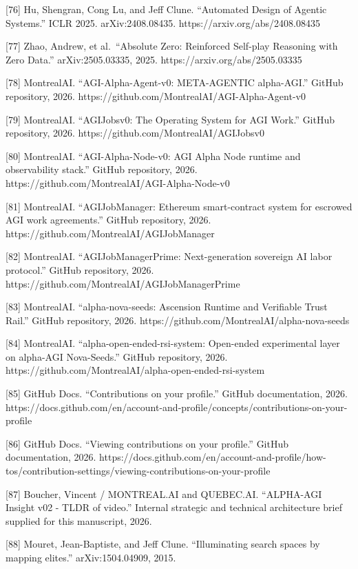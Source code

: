 \documentclass[
  11pt,
]{article}
\begin{document}
{[}76{]} Hu, Shengran, Cong Lu, and Jeff Clune. ``Automated Design of
Agentic Systems.'' ICLR 2025. arXiv:2408.08435.
https://arxiv.org/abs/2408.08435

{[}77{]} Zhao, Andrew, et al.~``Absolute Zero: Reinforced Self-play
Reasoning with Zero Data.'' arXiv:2505.03335, 2025.
https://arxiv.org/abs/2505.03335

{[}78{]} MontrealAI. ``AGI-Alpha-Agent-v0: META-AGENTIC alpha-AGI.''
GitHub repository, 2026.
https://github.com/MontrealAI/AGI-Alpha-Agent-v0

{[}79{]} MontrealAI. ``AGIJobsv0: The Operating System for AGI Work.''
GitHub repository, 2026. https://github.com/MontrealAI/AGIJobsv0

{[}80{]} MontrealAI. ``AGI-Alpha-Node-v0: AGI Alpha Node runtime and
observability stack.'' GitHub repository, 2026.
https://github.com/MontrealAI/AGI-Alpha-Node-v0

{[}81{]} MontrealAI. ``AGIJobManager: Ethereum smart-contract system for
escrowed AGI work agreements.'' GitHub repository, 2026.
https://github.com/MontrealAI/AGIJobManager

{[}82{]} MontrealAI. ``AGIJobManagerPrime: Next-generation sovereign AI
labor protocol.'' GitHub repository, 2026.
https://github.com/MontrealAI/AGIJobManagerPrime

{[}83{]} MontrealAI. ``alpha-nova-seeds: Ascension Runtime and
Verifiable Trust Rail.'' GitHub repository, 2026.
https://github.com/MontrealAI/alpha-nova-seeds

{[}84{]} MontrealAI. ``alpha-open-ended-rsi-system: Open-ended
experimental layer on alpha-AGI Nova-Seeds.'' GitHub repository, 2026.
https://github.com/MontrealAI/alpha-open-ended-rsi-system

{[}85{]} GitHub Docs. ``Contributions on your profile.'' GitHub
documentation, 2026.
https://docs.github.com/en/account-and-profile/concepts/contributions-on-your-profile

{[}86{]} GitHub Docs. ``Viewing contributions on your profile.'' GitHub
documentation, 2026.
https://docs.github.com/en/account-and-profile/how-tos/contribution-settings/viewing-contributions-on-your-profile

{[}87{]} Boucher, Vincent / MONTREAL.AI and QUEBEC.AI. ``ALPHA-AGI
Insight v02 - TLDR of video.'' Internal strategic and technical
architecture brief supplied for this manuscript, 2026.

{[}88{]} Mouret, Jean-Baptiste, and Jeff Clune. ``Illuminating search
spaces by mapping elites.'' arXiv:1504.04909, 2015.
\end{document}
